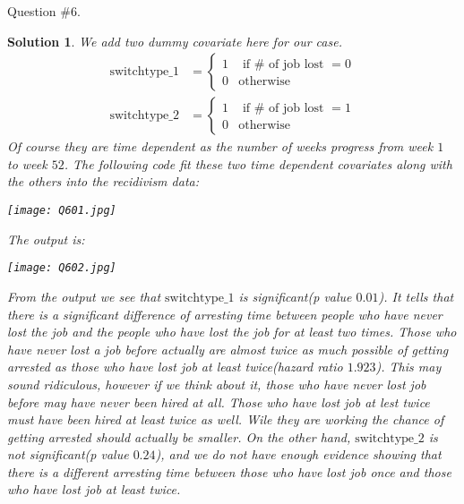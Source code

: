 \documentclass[11pt]{article}
\newtheorem{sol}{Solution}
\begin{document}
Question $\#6$.
\begin{sol}
	We add two dummy covariate here for our case. 
	\begin{align*}
		\text{switchtype}\_1 &= \left\{\begin{array}{ll} 1& \text{ if }\# \text{ of job lost }= 0\\ 0& \text{otherwise} \end{array}\right.\\
		\text{switchtype}\_2 &= \left\{\begin{array}{ll} 1& \text{ if }\# \text{ of job lost }= 1\\ 0& \text{otherwise} \end{array}\right.
	\end{align*}
	Of course they are time dependent as the number of weeks progress from week $1$ to week $52$.\vskip 2mm
	The following code fit these two time dependent covariates along with the others into the recidivism data:
	\begin{center}
		\texttt{[image: Q601.jpg]}
	\end{center}
	The output is:
	\begin{center}
		\texttt{[image: Q602.jpg]}
	\end{center}
	From the output we see that $\text{switchtype}\_1$ is significant(p value $0.01$). It tells that there is a significant difference of arresting time between people who have never lost the job and the people who have lost the job for at least two times. Those who have never lost a job before actually are almost twice as much possible of getting arrested as those who have lost job at least twice(hazard ratio $1.923$). This may sound ridiculous, however if we think about it, those who have never lost job before may have never been hired at all. Those who have lost job at lest twice must have been hired at least twice as well. Wile they are working the chance of getting arrested should actually be smaller.\vskip 2mm
	On the other hand, $\text{switchtype}\_2$ is not significant(p value $0.24$), and we do not have enough evidence showing that there is a different arresting time between those who have lost job once and those who have lost job at least twice.
\end{sol}
\end{document}
